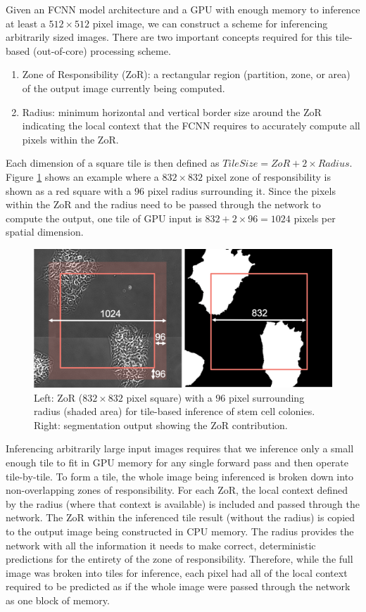 \documentclass[runningheads]{llncs}
\begin{document}
Given an FCNN model architecture and a GPU with enough memory to inference at least a $512 \times 512$ pixel image, we can construct a scheme for inferencing arbitrarily sized images. There are two important concepts required for this tile-based (out-of-core) processing scheme. 
\begin{enumerate}
	\item Zone of Responsibility (ZoR): a rectangular region (partition, zone, or area) of the output image currently being computed.
	\item Radius: minimum horizontal and vertical border size around the ZoR indicating the local context that the FCNN requires to accurately compute all pixels within the ZoR.
\end{enumerate}

Each dimension of a square tile is then defined as $TileSize = ZoR + 2 \times Radius$. 
Figure \ref{fig:zor} shows an example where a $832 \times 832$ pixel zone of responsibility is shown as a red square with a $96$ pixel radius surrounding it. 
Since the pixels within the ZoR and the radius need to be passed through the network to compute the output, one tile of GPU input is $832 + 2 \times 96 = 1024$ pixels per spatial dimension.

\begin{figure}[h!]
	\centering
		\includegraphics[width=\linewidth]{figs/zor.png}
	\caption{Left: ZoR ($832 \times 832$ pixel square) with a $96$ pixel surrounding radius (shaded area) for tile-based inference of stem cell colonies. Right: segmentation output showing the ZoR contribution.}
	\label{fig:zor}
\end{figure}

Inferencing arbitrarily large input images requires that we inference only a small enough tile to fit in GPU memory for any single forward pass and then operate tile-by-tile. To form a tile, the whole image being inferenced is broken down into non-overlapping zones of responsibility. For each ZoR, the local context defined by the radius (where that context is available) is included and passed through the network. The ZoR within the inferenced tile result (without the radius) is copied to the output image being constructed in CPU memory. The radius provides the network with all the information it needs to make correct, deterministic predictions for the entirety of the zone of responsibility. 
Therefore, while the full image was broken into tiles for inference, each pixel had all of the local context required to be predicted as if the whole image were passed through the network as one block of memory. 
\end{document}
